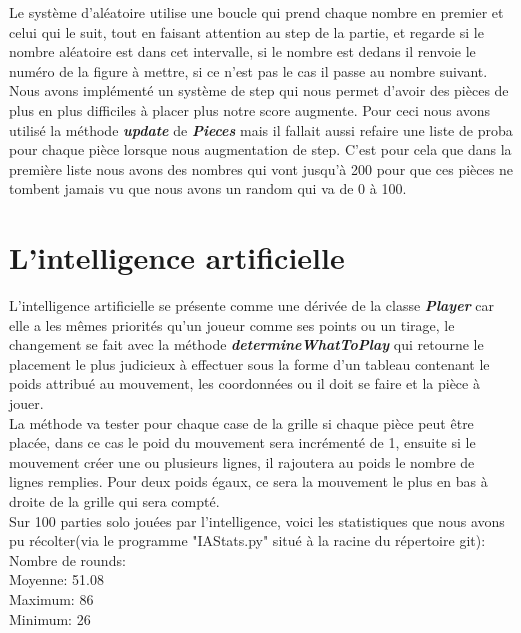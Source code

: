 \documentclass[a4paper]{report}
\begin{document}
Le système d’aléatoire utilise une boucle qui prend chaque nombre en premier et celui qui le suit, tout en faisant attention au step de la partie, et regarde si le nombre aléatoire est dans cet intervalle, si le nombre est dedans il renvoie le numéro de la figure à mettre, si ce n’est pas le cas il passe au nombre suivant. \\

Nous avons implémenté un système de step qui nous permet d'avoir des pièces de plus en plus difficiles à placer plus notre score augmente. Pour ceci nous avons utilisé la méthode \textbf{\textit{update}} de \textbf{\textit{Pieces}} mais il fallait aussi refaire une liste de proba pour chaque pièce lorsque nous augmentation de step. C'est pour cela que dans la première liste nous avons des nombres qui vont jusqu'à 200 pour que ces pièces ne tombent jamais vu que nous avons un random qui va de 0 à 100.

\section{L'intelligence artificielle}
L'intelligence artificielle se présente comme une dérivée de la classe \textbf{\textit{Player}} car elle a les mêmes priorités qu'un joueur comme ses points ou un tirage, le changement se fait avec la méthode \textbf{\textit{determineWhatToPlay}} qui retourne le placement le plus judicieux à effectuer sous la forme d'un tableau contenant le poids attribué au mouvement, les coordonnées ou il doit se faire et la pièce à jouer. \\

La méthode va tester pour chaque case de la grille si chaque pièce peut être placée, dans ce cas le poid du mouvement sera incrémenté de 1, ensuite si le mouvement créer une ou plusieurs lignes, il rajoutera au poids le nombre de lignes remplies. Pour deux poids égaux, ce sera la mouvement le plus en bas à droite de la grille qui sera compté. \\

Sur 100 parties solo jouées par l'intelligence, voici les statistiques que nous avons pu récolter(via le programme "IAStats.py" situé à la racine du répertoire git): \\

Nombre de rounds:\\
Moyenne: 51.08\\
Maximum: 86\\
Minimum: 26\\
\end{document}
